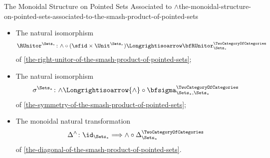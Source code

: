\begin{proposition}{The Monoidal Structure on Pointed Sets Associated to $\wedge$}{the-monoidal-structure-on-pointed-sets-associated-to-the-smash-product-of-pointed-sets}
\begin{itemize}
            \[
                \LUnitor^{\Sets_{*}}%
                \colon%
                {\wedge}\circ{(\Unit^{\Sets_{*}}\times\id_{\Sets_{*}})}
                \Longrightisoarrow
                \bfLUnitor^{\TwoCategoryOfCategories}_{\Sets_{*}}
            \]
            of \cref{the-left-unitor-of-the-smash-product-of-pointed-sets};
        \item{}The natural isomorphism
            \[
                \RUnitor^{\Sets_{*}}%
                \colon%
                {\wedge}\circ{({\sfid}\times{\Unit^{\Sets_{*}}})}%
                \Longrightisoarrow%
                \bfRUnitor^{\TwoCategoryOfCategories}_{\Sets_{*}}%
            \]
            of \cref{the-right-unitor-of-the-smash-product-of-pointed-sets};
        \item{}The natural isomorphism
            \[
                \sigma^{\Sets_{*}}
                \colon
                {\wedge}
                \Longrightisoarrow
                {\wedge}\circ{\bfsigma^{\TwoCategoryOfCategories}_{\Sets_{*},\Sets_{*}}}
            \]
            of \cref{the-symmetry-of-the-smash-product-of-pointed-sets};
        \item{}The monoidal natural transformation
            \[
                \Delta^{\wedge}%
                \colon%
                \id_{\Sets_{*}}%
                \Longrightarrow%
                \wedge\circ\Delta^{\TwoCategoryOfCategories}_{\Sets_{*}}%
            \]
            of \cref{the-diagonal-of-the-smash-product-of-pointed-sets}.
    \end{itemize}
\end{proposition}
